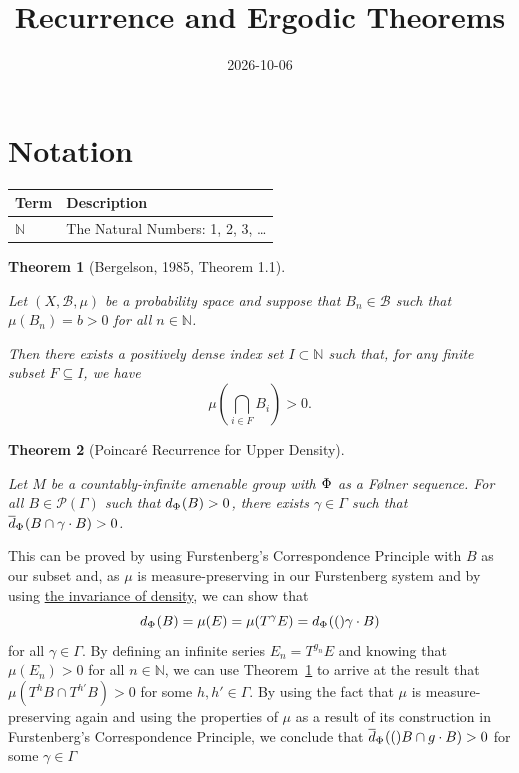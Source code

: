 \documentclass[
  british,
]{article}
\title{Recurrence and Ergodic Theorems}
\author{}
\date{2026-10-06}
\newcounter{none} %
\theoremstyle{plain}
\theoremstyle{plain}
\newtheorem{theorem}{Theorem}[section]
\theoremstyle{remark}
\newcommand{\Folner}[1][\vphantom{}]{{\Phi}_{#1}}
\newcommand{\Group}{{\Gamma}}
\newcommand{\GroupAction}[2]{T^{#1}{#2}}
\newcommand{\GroupElement}{{\gamma}}
\newcommand{\GroupOperation}[2]{{#1}\cdot{#2}}
\newcommand{\Measure}{{\mu}}
\newcommand{\Monoid}{{M}}
\newcommand{\N}{\mathbb{N}}
\newcommand{\SigmaAlgebra}[1]{{\mathscr{#1}}}
\newcommand{\Density}[2][\Folner]{d_{{#1}}({#2})}
\newcommand{\UpperDensity}[2][\Folner]{\overline{d}_{{#1}}({#2})}
\begin{document}
\maketitle


\section*{Notation}\label{sec-Notation}

{\def\LTcaptype{none} %
\begin{longtable}[]{@{}ll@{}}
\toprule\noalign{}
Term & Description \\
\midrule\noalign{}
\endhead
\bottomrule\noalign{}
\endlastfoot
\(\N\) & The Natural Numbers: 1, 2, 3, \ldots{} \\
\end{longtable}
}

\begin{theorem}[{Bergelson, 1985, Theorem
1.1}]\protect\hypertarget{thm-recurrence}{}\label{thm-recurrence}

Let \((X,\SigmaAlgebra{B},\Measure)\) be a probability space and suppose
that \(B_n\in\SigmaAlgebra{B}\) such that \(\Measure(B_n)=b>0\) for all
\(n\in\mathbb{N}\).

Then there exists a positively dense index set \(I\subset\mathbb{N}\)
such that, for any finite subset \(F\subseteq I\), we have
\[\Measure\left(\bigcap_{i\in F}B_i \right)>0. \]

\end{theorem}

\begin{theorem}[Poincaré Recurrence for Upper
Density]\protect\hypertarget{thm-PoincareRecurrence}{}\label{thm-PoincareRecurrence}

Let \(\Monoid\) be a countably-infinite amenable group with \(\Folner\)
as a Følner sequence. For all \(B\in\mathcal{P}(\Group)\) such that
\(\Density{B}>0\), there exists \(\GroupElement\in\Group\) such that
\(\UpperDensity{B\cap \GroupOperation{\GroupElement}{B}}>0\).

\end{theorem}

This can be proved by using Furstenberg's Correspondence Principle with
\(B\) as our subset and, as \(\Measure\) is measure-preserving in our
Furstenberg system and by using
\href{../1_Amenable_and_Density/density.qmd\#prp-DensityTranslationInvariance}{the
invariance of density}, we can show that
\[\Density{B}=\Measure(E)=\Measure(\GroupAction{\GroupElement}{E})=\Density(\GroupOperation{\GroupElement}{B})\]
for all \(\GroupElement\in\Group\). By defining an infinite series
\(E_n=\GroupAction{g_n}{E}\) and knowing that \(\Measure(E_n)>0\) for
all \(n\in\N\), we can use Theorem~\ref{thm-recurrence} to arrive at the
result that \(\Measure(\GroupAction{h}{B}\cap \GroupAction{h'}{B})>0\)
for some \(h,h'\in\Group\). By using the fact that \(\Measure\) is
measure-preserving again and using the properties of \(\Measure\) as a
result of its construction in Furstenberg's Correspondence Principle, we
conclude that \(\UpperDensity(B\cap\GroupOperation{g}{B})>0\) for some
\(\GroupElement\in\Group\)
\end{document}
